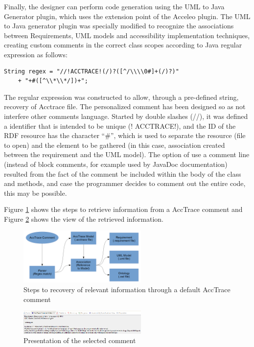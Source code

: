 \documentclass[10pt, conference, compsocconf]{IEEEtran}
\begin{document}
Finally, the designer can perform code generation using the UML to Java Generator plugin, which uses the extension point of the Acceleo plugin.
The UML to Java generator plugin was specially modified to recognize the associations between Requirements, UML models and accessibility implementation techniques, creating custom comments in the correct class scopes according to Java regular expression as follows:

\begin{lstlisting}
String regex = "//!ACCTRACE!(/)?([^/\\\\0#]+(/)?)"
	+ "+#([^\\*\\*/])+";
\end{lstlisting}

The regular expression was constructed to allow, through a pre-defined string, recovery of Acctrace file. The personalized 
comment has been designed so as not interfere other
comments language. Started by double slashes (//), it was defined a
identifier that is intended to be unique (! ACCTRACE!), and the ID of the RDF resource has the character ``\#'', which is used to separate 
the resource (file to open) and the element to be gathered (in this case,
association created between the requirement and the UML model). The option of
use a comment line (instead of block comments, for example used by JavaDoc documentation) resulted from the fact
of the comment be included within the body of the class and methods, and case
the programmer decides to comment out the entire code, this may be possible. 

Figure \ref{fig:commentrecovery} shows the steps to retrieve information from a AccTrace comment and Figure \ref{fig:commentview}
shows the view of the retrieved information.


\begin{figure}[!t]
\centering
\includegraphics[width=2.5in]{./img/commentrecovery.png}
\caption{Steps to recovery of relevant information through a
default AccTrace comment}
\label{fig:commentrecovery}
\end{figure} 

\begin{figure}[!t]
\centering
\includegraphics[width=2.5in]{./img/commentview.png}
\caption{Presentation of the selected comment}
\label{fig:commentview}
\end{figure}
\end{document}
